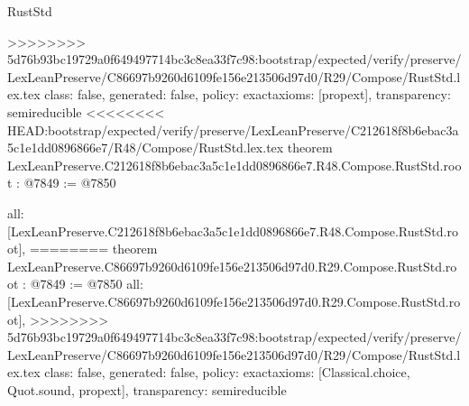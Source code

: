\begin{lexlean}{RustStd}
\begin{coremodule}
{\begin{coremodule}
{{{{{{{{{{{>>>>>>>> 5d76b93bc19729a0f649497714bc3c8ea33f7c98:bootstrap/expected/verify/preserve/LexLeanPreserve/C86697b9260d6109fe156e213506d97d0/R29/Compose/RustStd.lex.tex
  class: false,
  generated: false,
  policy: exact{axioms: [propext]},
  transparency: semireducible
}
<<<<<<<< HEAD:bootstrap/expected/verify/preserve/LexLeanPreserve/C212618f8b6ebac3a5c1e1dd0896866e7/R48/Compose/RustStd.lex.tex
theorem LexLeanPreserve.C212618f8b6ebac3a5c1e1dd0896866e7.R48.Compose.RustStd.root : @7849 := @7850 {
  all: [LexLeanPreserve.C212618f8b6ebac3a5c1e1dd0896866e7.R48.Compose.RustStd.root],
========
theorem LexLeanPreserve.C86697b9260d6109fe156e213506d97d0.R29.Compose.RustStd.root : @7849 := @7850 {
  all: [LexLeanPreserve.C86697b9260d6109fe156e213506d97d0.R29.Compose.RustStd.root],
>>>>>>>> 5d76b93bc19729a0f649497714bc3c8ea33f7c98:bootstrap/expected/verify/preserve/LexLeanPreserve/C86697b9260d6109fe156e213506d97d0/R29/Compose/RustStd.lex.tex
  class: false,
  generated: false,
  policy: exact{axioms: [Classical.choice, Quot.sound, propext]},
  transparency: semireducible
}

}}}}}}}}}}}
\end{coremodule}}
\end{coremodule}
\end{lexlean}
